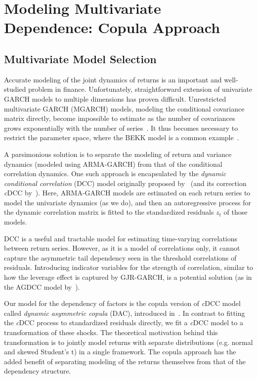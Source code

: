 
\section{Modeling Multivariate Dependence: Copula Approach} %
\label{sec:modeling_multivariate_dependence_copula_approach}

\subsection{Multivariate Model Selection} %
\label{sub:multivariate_model_selection}

Accurate modeling of the joint dynamics of returns is an important and well-studied problem in finance. Unfortunately, straightforward extension of univariate GARCH models to multiple dimensions has proven difficult. Unrestricted multivariate GARCH (MGARCH) models, modeling the conditional covariance matrix directly, become impossible to estimate as the number of covariances grows exponentially with the number of series~\autocite{WhyMGARCHSucks}. It thus becomes necessary to restrict the parameter space, where the BEKK model is a common example~\autocite{BEKKModel}.

A parsimonious solution is to separate the modeling of return and variance dynamics (modeled using ARMA-GARCH) from that of the conditional correlation dynamics. One such approach is encapsulated by the \emph{dynamic conditional correlation} (DCC) model originally proposed by~\autocite{Engle2002} (and its correction \emph{c}DCC by~\autocite{Aielli2013}). Here, ARMA-GARCH models are estimated on each return series to model the univariate dynamics (as we do), and then an autoregressive process for the dynamic correlation matrix is fitted to the standardized residuals $z_t$ of those models.

DCC is a useful and tractable model for estimating time-varying correlations between return series. However, as it is a model of correlations only, it cannot capture the asymmetric tail dependency seen in the threshold correlations of residuals. Introducing indicator variables for the strength of correlation, similar to how the leverage effect is captured by GJR-GARCH, is a potential solution (as in the AGDCC model by~\autocite{Cappiello2006}).

Our model for the dependency of factors is the copula version of \emph{c}DCC model called \emph{dynamic asymmetric copula} (DAC), introduced in~\autocite{ChristoffersenErrunzaJacobLanglois2012}. In contrast to fitting the \emph{c}DCC process to standardized residuals directly, we fit a \emph{c}DCC model to a transformation of these shocks. The theoretical motivation behind this transformation is to jointly model returns with separate distributions (e.g. normal and skewed Student's t) in a single framework. The copula approach has the added benefit of separating modeling of the returns themselves from that of the dependency structure.


